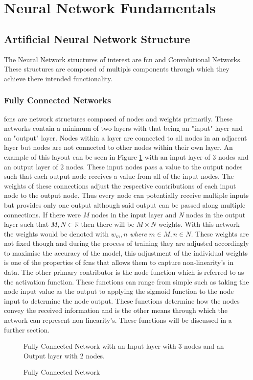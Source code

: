 \section{Neural Network Fundamentals}
\subsection{Artificial Neural Network Structure}
The Neural Network structures of interest are \acrfull{fcn} and Convolutional Networks. These structures are composed of multipls components through which they achieve there intended functionality.
\subsubsection{Fully Connected Networks}
\acrshort{fcn}s are network structures composed of nodes and weights primarily. These networks contain a minimum of two layers with that being an "input" layer and an "output" layer. Nodes within a layer are connected to all nodes in an adjacent layer but nodes are not connected to other nodes within their own layer. An example of this layout can be seen in Figure \ref{fig:basic_fcn_eg} with an input layer of 3 nodes and an output layer of 2 nodes. These input nodes pass a value to the output nodes such that each output node receives a value from all of the input nodes. The weights of these connections adjust the respective contributions of each input node to the output node. Thus every node can potentially receive multiple inputs but provides only one output although said output can be passed along multiple connections. If there were \textit{M} nodes in the input layer and \textit{N} nodes in the output layer such that \(M, N \in \mathbb{R}\) then there will be \(M \times N\) weights. With this network the weights would be denoted with \(w_m,n\) \textit{where} \(m \in M, n \in N\). These weights are not fixed though and during the process of training they are adjusted accordingly to maximise the accuracy of the model, this adjustment of the individual weights is one of the properties of \acrshort{fcn}s that allows them to capture non-linearity's in data. The other primary contributor is the node function which is referred to as the activation function. These functions can range from simple such as taking the node input value as the output to applying the sigmoid function to the node input to determine the node output. These functions determine how the nodes convey the received information and is the other means through which the network can represent non-linearity's. These functions will be discussed in a further section.
\begin{figure}
    \centering
    
    \caption{Fully Connected Network}
    \small
    Fully Connected Network with an Input layer with 3 nodes and an Output layer with 2 nodes.
    \label{fig:basic_fcn_eg}
\end{figure}
